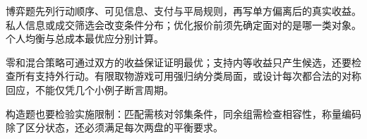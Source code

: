 博弈题先列行动顺序、可见信息、支付与平局规则，再写单方偏离后的真实收益。私人信息或成交筛选会改变条件分布；优化报价前须先确定面对的是哪一类对象。个人均衡与总成本最优应分别计算。

零和混合策略可通过双方的收益保证证明最优；支持内等收益只产生候选，还要检查所有支持外行动。有限取物游戏可用强归纳分类局面，或设计每次都合法的对称回应，不能仅凭几个小例子断言周期。

构造题也要检验实施限制：匹配需核对邻集条件，同余组需检查相容性，称量编码除了区分状态，还必须满足每次两盘的平衡要求。
\par\smallskip

